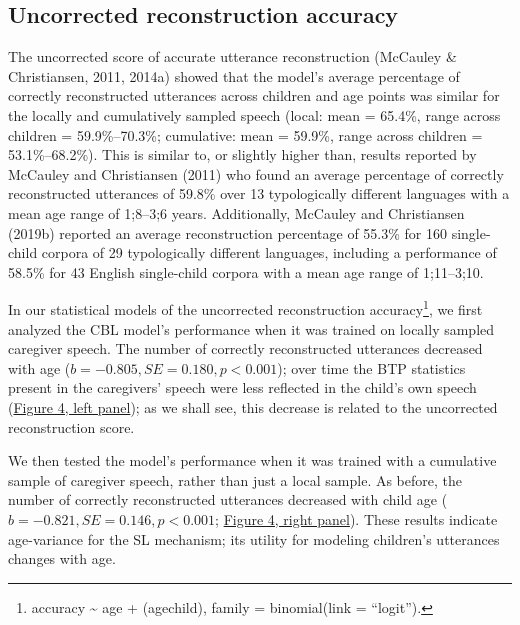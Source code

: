 \documentclass[
  english,
  man,mask,floatsintext]{apa6}
\begin{document}
\hypertarget{uncorrected-reconstruction-accuracy}{%
\subsection{Uncorrected reconstruction accuracy}\label{uncorrected-reconstruction-accuracy}}

The uncorrected score of accurate utterance reconstruction (McCauley \& Christiansen, 2011, 2014a) showed that the model's average percentage of correctly reconstructed utterances across children and age points was similar for the locally and cumulatively sampled speech (local: mean = 65.4\%, range across children = 59.9\%--70.3\%; cumulative: mean = 59.9\%, range across children = 53.1\%--68.2\%). This is similar to, or slightly higher than, results reported by McCauley and Christiansen (2011) who found an average percentage of correctly reconstructed utterances of 59.8\% over 13 typologically different languages with a mean age range of 1;8--3;6 years. Additionally, McCauley and Christiansen (2019b) reported an average reconstruction percentage of 55.3\% for 160 single-child corpora of 29 typologically different languages, including a performance of 58.5\% for 43 English single-child corpora with a mean age range of 1;11--3;10.

In our statistical models of the uncorrected reconstruction accuracy\footnote{accuracy \textasciitilde{} age + (age\textbar child), family = binomial(link = \enquote{logit}).}, we first analyzed the CBL model's performance when it was trained on locally sampled caregiver speech. The number of correctly reconstructed utterances decreased with age (\(b = -0.805, SE = 0.180, p < 0.001\)); over time the BTP statistics present in the caregivers' speech were less reflected in the child's own speech (\protect\hyperlink{fig4}{Figure 4, left panel}); as we shall see, this decrease is related to the uncorrected reconstruction score.

We then tested the model's performance when it was trained with a cumulative sample of caregiver speech, rather than just a local sample. As before, the number of correctly reconstructed utterances decreased with child age (\(b=-0.821, SE = 0.146, p < 0.001\); \protect\hyperlink{fig4}{Figure 4, right panel}). These results indicate age-variance for the SL mechanism; its utility for modeling children's utterances changes with age.
\end{document}
